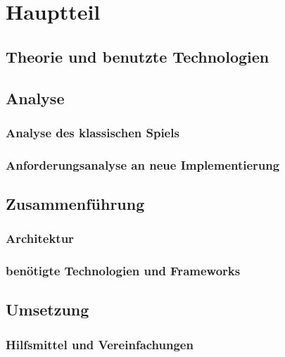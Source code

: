 \chapter{Hauptteil}
\label{cha:Hauptteil}

\section{Theorie und benutzte Technologien}
\label{sec:theorie}

\section{Analyse}
\label{sec:analyse}

\subsection{Analyse des klassischen Spiels}
\label{subsec:spiel_analyse}

\subsection{Anforderungsanalyse an neue Implementierung}
\label{subsec:neueImpl_analyse}

\section{Zusammenf\"uhrung}
\label{sec:zusammenfuhrung}

\subsection{Architektur}
\label{subsec:Architektur}

\subsection{ben\"otigte Technologien und Frameworks}
\label{subsec:Technologien}

\section{Umsetzung}
\label{sec:Umsetzung}

\subsection{Hilfsmittel und Vereinfachungen}
\label{subsec:Hilfsmittel}

